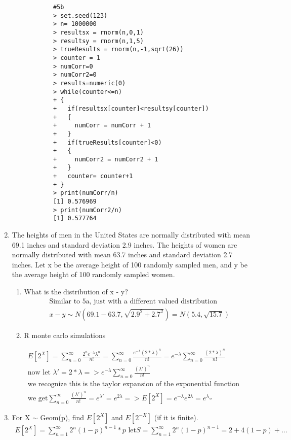 \documentclass[11pt]{article}
\begin{document}
\begin{enumerate}
\begin{enumerate}
	\begin{verbatim}
		#5b
		> set.seed(123)
		> n= 1000000
		> resultsx = rnorm(n,0,1)
		> resultsy = rnorm(n,1,5)
		> trueResults = rnorm(n,-1,sqrt(26))
		> counter = 1
		> numCorr=0
		> numCorr2=0
		> results=numeric(0) 
		> while(counter<=n)
		+ {
		+   if(resultsx[counter]<resultsy[counter])
		+   {
		+     numCorr = numCorr + 1
		+   }
		+   if(trueResults[counter]<0)
		+   {
		+     numCorr2 = numCorr2 + 1
		+   }
		+   counter= counter+1
		+ }
		> print(numCorr/n)
		[1] 0.576969
		> print(numCorr2/n)
		[1] 0.577764
	\end{verbatim}
\end{enumerate}
\item The heights of men in the United States are normally distributed with mean 69.1 inches and standard deviation
2.9 inches. The heights of women are normally distributed with mean 63.7 inches and standard deviation 2.7 inches. Let x be the average height of 100 randomly sampled men, and y be the average height
of 100 randomly sampled women.
\begin{enumerate}
	\item What is the distribution of x - y?
	\begin{gather}
		\text{Similar to 5a, just with a different valued distribution}\\
		x-y \sim N(69.1-63.7,\sqrt{2.9^2+2.7^2}) = N(5.4,\sqrt{15.7})
	\end{gather}
	\item R monte carlo simulations 
\end{enumerate}
\begin{gather} 
	E[2^X] =\sum_{n=0}^{\infty} \frac{2^n e^{-\lambda} \lambda ^n}{n!} = \sum_{n=0}^{\infty} \frac{e^{-\lambda} (2*\lambda) ^n}{n!} = e^{-\lambda}  \sum_{n=0}^{\infty} \frac{(2*\lambda) ^n}{n!}\\
	\text{now let } \lambda' = 2*\lambda => e^{-\lambda}  \sum_{n=0}^{\infty} \frac{(\lambda') ^n}{n!}\\
	\text{we recognize this is the taylor expansion of the exponential function}\\
	\text{we get} \sum_{n=0}^{\infty} \frac{(\lambda') ^n}{n!} = e^{\lambda'} = e^{2\lambda}  => E[2^X] = e^{-\lambda} e^{2\lambda}  = e^{\lambda} \square
\end{gather}
\item For X $\sim$ Geom(p), find $E[2^X]$ and $E[2^{-X}]$ (if it is finite).
\begin{gather} 
E[2^X] =\sum_{n=1}^{\infty} 2^n (1-p)^{n-1}*p \text{ let} S = \sum_{n=1}^{\infty} 2^n (1-p)^{n-1} = 2 + 4(1-p) +... \\

\end{gather}
\end{enumerate}
\end{document}
